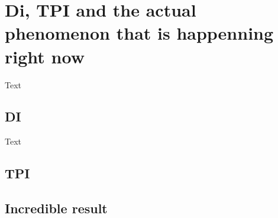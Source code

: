 \chapter{Di, TPI and the actual phenomenon that is happenning right now}
	
	Text
	
	\section{DI}
	
	Text
	
	\section{TPI}
	
	
	
	\section{Incredible result}